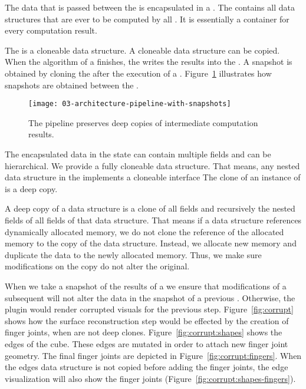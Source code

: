 \documentclass[../../ClassicThesis.tex]{subfiles}
\begin{document}
The data that is passed between the  is
encapsulated in a . The
 contains all data structures that are
ever to be computed by all . It is
essentially a container for every computation result.

The  is a cloneable data structure. A cloneable
data structure can be copied. When the algorithm of a
 finishes, the  writes the results
into the . A snapshot is obtained by cloning the
 after the execution of a .
Figure~\ref{fig:pipeline-with-snapshots} illustrates how snapshots are
obtained between the .

\begin{figure}[h]
  \centering
  \texttt{[image: 03-architecture-pipeline-with-snapshots]}
  \caption{The pipeline preserves deep copies of intermediate computation results.}
  \label{fig:pipeline-with-snapshots}
\end{figure}


The encapsulated data in the state can contain multiple
fields and can be hierarchical. We provide a fully cloneable
data structure. That means, any nested data structure in the
 implements a cloneable interface
The clone of an instance of  is a
deep copy.

A deep copy of a data structure is a clone of all fields and
recursively the nested fields of all fields of that data
structure. That means if a data structure references
dynamically allocated memory, we do not clone the reference
of the allocated memory to the copy of the data structure.
Instead, we allocate new memory and duplicate the data to
the newly allocated memory. Thus, we make sure modifications
on the copy do not alter the original.

When we take a snapshot of the results of a
 we ensure that modifications of a
subsequent  will not alter the data in
the snapshot of a previous . Otherwise,
the  plugin would render corrupted
visuals for the previous step. Figure~\ref{fig:corrupt}
shows how the surface reconstruction step would be effected
by the creation of finger joints, when 
are not deep clones. Figure~\ref{fig:corrupt:shapes} shows
the edges of the cube. These edges are mutated in order to
attach new finger joint geometry. The final finger joints
are depicted in Figure~\ref{fig:corrupt:fingers}. When the
edges data structure is not copied before adding the finger
joints, the edge visualization will also show the finger joints
(Figure~\ref{fig:corrupt:shapes-fingers}).
\end{document}
